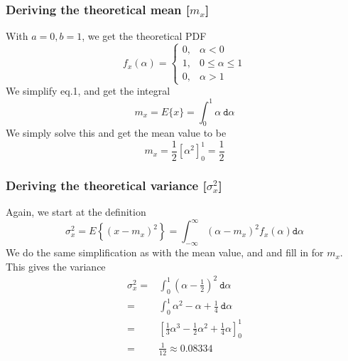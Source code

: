 \documentclass[compress]{beamer}
\begin{document}
\begin{frame}
    \frametitle{Deriving the theoretical mean [$m_x$]}
    With $a = 0, b = 1$, we get the theoretical PDF
    \begin{equation*}
        f_x(\alpha) = 
        \begin{cases}
            0, & \alpha < 0 \\
            1, & 0 \le \alpha \le 1 \\
            0, & \alpha > 1 
        \end{cases}
    \end{equation*}
    We simplify eq.1, and get the integral
    \begin{equation*}
        m_x = E\{x\} = \int_0^1\alpha \ \texttt{d}\alpha
    \end{equation*}
    We simply solve this and get the mean value to be
    \begin{equation*}
        m_x = \frac{1}{2} \left[\alpha^2\right]_0^1=\frac{1}{2}
    \end{equation*}
\end{frame}
\begin{frame}
    \frametitle{Deriving the theoretical variance [$\sigma_x^2$]}
    Again, we start at the definition
    \begin{equation}
        \sigma_x^2=E\left\{(x-m_x)^2\right\}=\int_{-\infty}^{\infty}
        (\alpha - m_x)^2 f_x( \alpha ) \texttt{d}\alpha
    \end{equation}
    We do the same simplification as with the mean value, and and fill in for $m_x$.
    This gives the variance
    \begin{align*}
        \sigma_x^2=& \int_0^1\left(\alpha-\frac{1}{2}\right)^2\ \texttt{d}\alpha \\
        =& \int_0^1 \alpha^2-\alpha+\frac{1}{4}\ \texttt{d} \alpha \\
        =& \left[\frac{1}{3}\alpha^3-\frac{1}{2}\alpha^2+\frac{1}{4}\alpha\right]^1_0 \\
        =& \frac{1}{12} \approx 0.08334
    \end{align*}
\end{frame}
\end{document}
